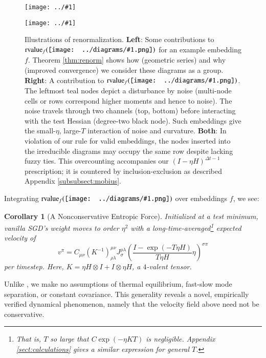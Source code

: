 \documentclass{article}
\theoremstyle{plain}
\newtheorem{cor}{Corollary}
\theoremstyle{definition}
\newcommand{\rvalue}{\text{\textnormal{rvalue}}}
\newcommand{\wrap}[1]{\left(#1\right)}
\newcommand{\plotmooh}[3]{
    \texttt{[image: ../\#1]}
}
\newcommand{\sdia}[1]{\begin{gathered}\texttt{[image: ../diagrams/\#1.png]}\end{gathered}}
\begin{document}
        \begin{figure}[h!]
            \centering  
            \plotmooh{diagrams/spacetime-g}{}{0.210\columnwidth}
            \plotmooh{diagrams/spacetime-h}{}{0.210\columnwidth}
            \caption{
                Illustrations of renormalization.
                {\bf Left}:
                    Some contributions to $\rvalue_f(\sdia{(0-1)(01)})$ for an
                    example embedding $f$.  Theorem \ref{thm:renorm} shows how
                    (geometric series) and why (improved convergence) we
                    consider these diagrams as a group.
                {\bf Right}:
                    A contribution to
                    $\rvalue_f(\sdia{(01-2)(02-12)})$. 
                    The leftmost {\color{mooteal}teal} nodes depict a disturbance by noise
                    (multi-node cells or rows correspond higher moments and
                    hence to noise).  The noise travels through two
                    channels (top, bottom) before interacting with the test
                    Hessian (degree-two black node).  Such embeddings give the
                    small-$\eta$, large-$T$ interaction of noise and curvature. 
                {\bf Both}:
                    In violation of our rule for valid embeddings, the nodes
                    inserted into the irreducible diagrams may occupy the same
                    row despite lacking fuzzy ties.  This
                    overcounting accompanies our $(I-\eta H)^{\Delta t-1}$
                    prescription; it is countered by inclusion-exclusion as
                    described Appendix \ref{subsubsect:mobius}.
            }
            \label{fig:renormspacetime}
        \end{figure}

        Integrating $\rvalue_f(\sdia{(01-2-3)(02-12-23)})$ over embeddings $f$, we see:
        \begin{cor}[A Nonconservative Entropic Force]\label{cor:entropic}
            Initialized at a test minimum, vanilla SGD's weight moves to
            order $\eta^2$ with a long-time-averaged\footnote{
                That is, $T$ so large that $C \exp(-\eta K T)$ is negligible.
                Appendix \ref{sect:calculations} gives a similar expression for general $T$.
            }
            expected velocity of
            $$
                v^\pi = C_{\mu \nu}
                \wrap{K^{-1}}^{\mu\nu}_{\rho\lambda}
                J^{\rho\lambda}_{\sigma}
                \wrap{\frac{I - \exp(-T \eta H)}{T \eta H} \eta}^{\sigma \pi}
            $$
            per timestep.
            Here, $K = \eta H \otimes I + I \otimes \eta H$, a
            $4$-valent tensor. 
        \end{cor}
        Unlike \citet{we19b}, we make no assumptions of thermal
        equilibrium, fast-slow mode separation, or constant covariance.  This
        generality reveals a novel, empirically verified
        dynamical phenomenon, namely that the velocity field above need not be
        conservative.
\end{document}
